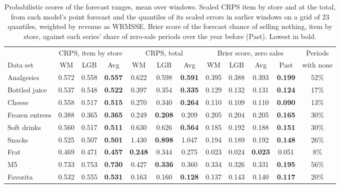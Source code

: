 \begin{table}[t]
\centering\footnotesize\setlength{\tabcolsep}{4pt}
\caption{Probabilistic scores of the forecast ranges, mean over windows. Scaled CRPS item by store and at the
total, from each model's point forecast and the quantiles of its scaled errors in earlier windows on a grid of 23
quantiles, weighted by revenue as WRMSSE. Brier score of the forecast chance of selling nothing, item by store,
against each series' share of zero-sale periods over the year before (Past). Lowest in bold.}
\label{tab:sup-probabilistic}
\begin{adjustbox}{max width=\textwidth}\begin{tabular}{l ccc ccc cccc c}
\toprule
 & \multicolumn{3}{c}{CRPS, item by store} & \multicolumn{3}{c}{CRPS, total} & \multicolumn{4}{c}{Brier score, zero sales} & Periods\\
\cmidrule(lr){2-4}\cmidrule(lr){5-7}\cmidrule(lr){8-11}
Data set & WM & LGB & Avg & WM & LGB & Avg & WM & LGB & Avg & Past & with none\\
\midrule
Analgesics & 0.572 & 0.558 & \textbf{0.557} & 0.622 & 0.598 & \textbf{0.591} & 0.395 & 0.388 & 0.393 & \textbf{0.199} & 52\% \\
Bottled juice & 0.537 & 0.548 & \textbf{0.522} & 0.397 & 0.354 & \textbf{0.335} & 0.129 & 0.132 & 0.131 & \textbf{0.124} & 17\% \\
Cheese & 0.558 & 0.517 & \textbf{0.515} & 0.270 & 0.340 & \textbf{0.264} & 0.110 & 0.109 & 0.110 & \textbf{0.090} & 13\% \\
Frozen entrees & 0.388 & 0.365 & \textbf{0.365} & 0.249 & \textbf{0.208} & 0.209 & 0.205 & 0.204 & 0.205 & \textbf{0.165} & 30\% \\
Soft drinks & 0.560 & 0.517 & \textbf{0.511} & 0.630 & 0.626 & \textbf{0.564} & 0.185 & 0.192 & 0.188 & \textbf{0.151} & 30\% \\
Snacks & 0.525 & 0.507 & \textbf{0.501} & 1.430 & \textbf{0.898} & 1.047 & 0.194 & 0.189 & 0.192 & \textbf{0.148} & 26\% \\
Frat & 0.469 & 0.471 & \textbf{0.457} & \textbf{0.248} & 0.344 & 0.275 & 0.023 & 0.024 & \textbf{0.023} & 0.051 & 8\% \\
M5 & 0.733 & 0.753 & \textbf{0.730} & 0.427 & \textbf{0.336} & 0.360 & 0.334 & 0.326 & 0.331 & \textbf{0.195} & 56\% \\
Favorita & 0.532 & 0.555 & \textbf{0.531} & 0.163 & 0.160 & \textbf{0.128} & 0.137 & 0.143 & 0.140 & \textbf{0.117} & 20\% \\
\bottomrule
\end{tabular}\end{adjustbox}
\end{table}
